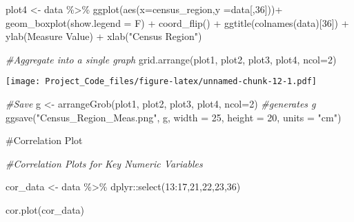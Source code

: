 \documentclass[
]{article}
\newenvironment{Shaded}{\begin{snugshade}}{\end{snugshade}}
\newcommand{\AttributeTok}[1]{\textcolor[rgb]{0.77,0.63,0.00}{#1}}
\newcommand{\CommentTok}[1]{\textcolor[rgb]{0.56,0.35,0.01}{\textit{#1}}}
\newcommand{\DecValTok}[1]{\textcolor[rgb]{0.00,0.00,0.81}{#1}}
\newcommand{\FunctionTok}[1]{\textcolor[rgb]{0.00,0.00,0.00}{#1}}
\newcommand{\NormalTok}[1]{#1}
\newcommand{\OtherTok}[1]{\textcolor[rgb]{0.56,0.35,0.01}{#1}}
\newcommand{\SpecialCharTok}[1]{\textcolor[rgb]{0.00,0.00,0.00}{#1}}
\newcommand{\StringTok}[1]{\textcolor[rgb]{0.31,0.60,0.02}{#1}}
\begin{document}
\begin{Shaded}
\begin{Highlighting}[]
\NormalTok{plot4 }\OtherTok{\textless{}{-}}\NormalTok{ data }\SpecialCharTok{\%\textgreater{}\%} \FunctionTok{ggplot}\NormalTok{(}\FunctionTok{aes}\NormalTok{(}\AttributeTok{x=}\NormalTok{census\_region,}\AttributeTok{y =}\NormalTok{data[,}\DecValTok{36}\NormalTok{]))}\SpecialCharTok{+}
  \FunctionTok{geom\_boxplot}\NormalTok{(}\AttributeTok{show.legend =}\NormalTok{ F) }\SpecialCharTok{+}
  \FunctionTok{coord\_flip}\NormalTok{() }\SpecialCharTok{+}
  \FunctionTok{ggtitle}\NormalTok{(}\FunctionTok{colnames}\NormalTok{(data)[}\DecValTok{36}\NormalTok{]) }\SpecialCharTok{+} 
  \FunctionTok{ylab}\NormalTok{(}\StringTok{\textquotesingle{}Measure Value\textquotesingle{}}\NormalTok{) }\SpecialCharTok{+} \FunctionTok{xlab}\NormalTok{(}\StringTok{"Census Region"}\NormalTok{)}

\CommentTok{\#Aggregate into a single graph}
\FunctionTok{grid.arrange}\NormalTok{(plot1, plot2, plot3, plot4, }\AttributeTok{ncol=}\DecValTok{2}\NormalTok{)}
\end{Highlighting}
\end{Shaded}

\texttt{[image: Project\_Code\_files/figure-latex/unnamed-chunk-12-1.pdf]}

\begin{Shaded}
\begin{Highlighting}[]
\CommentTok{\#Save}
\NormalTok{g }\OtherTok{\textless{}{-}} \FunctionTok{arrangeGrob}\NormalTok{(plot1, plot2, plot3, plot4, }\AttributeTok{ncol=}\DecValTok{2}\NormalTok{) }\CommentTok{\#generates g}
\FunctionTok{ggsave}\NormalTok{(}\StringTok{"Census\_Region\_Meas.png"}\NormalTok{, g, }\AttributeTok{width =} \DecValTok{25}\NormalTok{, }\AttributeTok{height =} \DecValTok{20}\NormalTok{, }\AttributeTok{units =} \StringTok{"cm"}\NormalTok{)}
\end{Highlighting}
\end{Shaded}

\#Correlation Plot

\begin{Shaded}
\begin{Highlighting}[]
\CommentTok{\#Correlation Plots for Key Numeric Variables}

\NormalTok{cor\_data }\OtherTok{\textless{}{-}}\NormalTok{ data }\SpecialCharTok{\%\textgreater{}\%}\NormalTok{ dplyr}\SpecialCharTok{::}\FunctionTok{select}\NormalTok{(}\DecValTok{13}\SpecialCharTok{:}\DecValTok{17}\NormalTok{,}\DecValTok{21}\NormalTok{,}\DecValTok{22}\NormalTok{,}\DecValTok{23}\NormalTok{,}\DecValTok{36}\NormalTok{)}

\FunctionTok{cor.plot}\NormalTok{(cor\_data)}
\end{Highlighting}
\end{Shaded}
\end{document}
